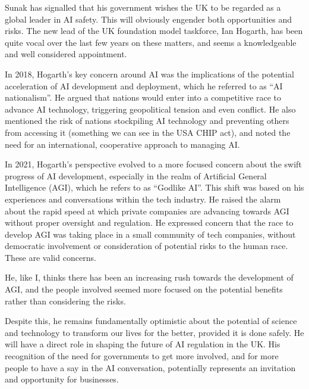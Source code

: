 Sunak has signalled that his government wishes the UK to be regarded as a global leader in AI safety. This will obviously engender both opportunities and risks. The new lead of the UK foundation model taskforce, Ian Hogarth, has been quite vocal over the last few years on these matters, and seems a knowledgeable and well considered appointment.\par
In 2018, Hogarth's key concern around AI was the implications of the potential acceleration of AI development and deployment, which he referred to as ``AI nationalism''. He argued that nations would enter into a competitive race to advance AI technology, triggering geopolitical tension and even conflict. He also mentioned the risk of nations stockpiling AI technology and preventing others from accessing it (something we can see in the USA CHIP act), and noted the need for an international, cooperative approach to managing AI.\par
In 2021, Hogarth’s perspective evolved to a more focused concern about the swift progress of AI development, especially in the realm of Artificial General Intelligence (AGI), which he refers to as ``Godlike AI''. This shift was based on his experiences and conversations within the tech industry. He raised the alarm about the rapid speed at which private companies are advancing towards AGI without proper oversight and regulation.  He expressed concern that the race to develop AGI was taking place in a small community of tech companies, without democratic involvement or consideration of potential risks to the human race. These are valid concerns.\par
He, like I, thinks there has been an increasing rush towards the development of AGI, and the people involved seemed more focused on the potential benefits rather than considering the risks. \par 
Despite this, he remains fundamentally optimistic about the potential of science and technology to transform our lives for the better, provided it is done safely. He will have a direct role in shaping the future of AI regulation in the UK. His recognition of the need for governments to get more involved, and for more people to have a say in the AI conversation, potentially represents an invitation and opportunity for businesses. 

